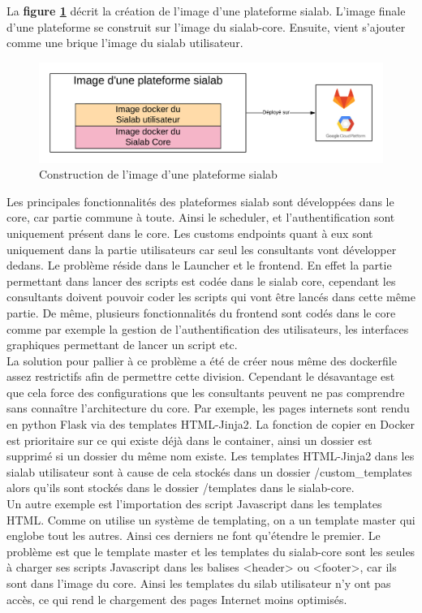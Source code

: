 \documentclass{article} %
\begin{document}
La \textbf{figure \ref{fig:siasia}} décrit la création de l'image d'une plateforme sialab. L'image finale d'une plateforme se construit sur l'image du sialab-core. Ensuite, vient s'ajouter comme une brique l'image du sialab utilisateur. 
\begin{figure}[!h]
	\centering
	\includegraphics[keepaspectratio = true,scale=0.6]{sia-core.png}
	\caption{Construction de l'image d'une plateforme sialab}
	\label{fig:siasia}
\end{figure}

Les principales fonctionnalités des plateformes sialab sont développées dans le core, car partie commune à toute. Ainsi le scheduler, et l'authentification sont uniquement présent dans le core. Les customs endpoints quant à eux sont uniquement dans la partie utilisateurs car seul les consultants vont développer dedans. Le problème réside dans le Launcher et le frontend. En effet la partie permettant dans lancer des scripts est codée dans le sialab core, cependant les consultants doivent pouvoir coder les scripts qui vont être lancés dans cette même partie. De même, plusieurs fonctionnalités du frontend sont codés dans le core comme par exemple la gestion de l'authentification des utilisateurs, les interfaces graphiques permettant de lancer un script etc.\\

La solution pour pallier à ce problème a été de créer nous même des dockerfile assez restrictifs afin de permettre cette division. Cependant le désavantage est que cela force des configurations que les consultants peuvent ne pas comprendre sans connaître l'architecture du core. Par exemple, les pages internets sont rendu en python Flask via des templates HTML-Jinja2. La fonction de copier en Docker est prioritaire sur ce qui existe déjà dans le container, ainsi un dossier est supprimé si un dossier du même nom existe. Les templates HTML-Jinja2 dans les sialab utilisateur sont à cause de cela stockés dans un dossier /custom\_templates alors qu'ils sont stockés dans le dossier /templates dans le sialab-core.\\
Un autre exemple est l'importation des script Javascript dans les templates HTML. Comme on utilise un système de templating, on a un template master qui englobe tout les autres. Ainsi ces derniers ne font qu'étendre le premier. Le problème est que le template master et les templates du sialab-core sont les seules à charger ses scripts Javascript dans les balises <header> ou <footer>, car ils sont dans l'image du core. Ainsi les templates du silab utilisateur n'y ont pas accès, ce qui rend le chargement des pages Internet moins optimisés.\\
\end{document}
